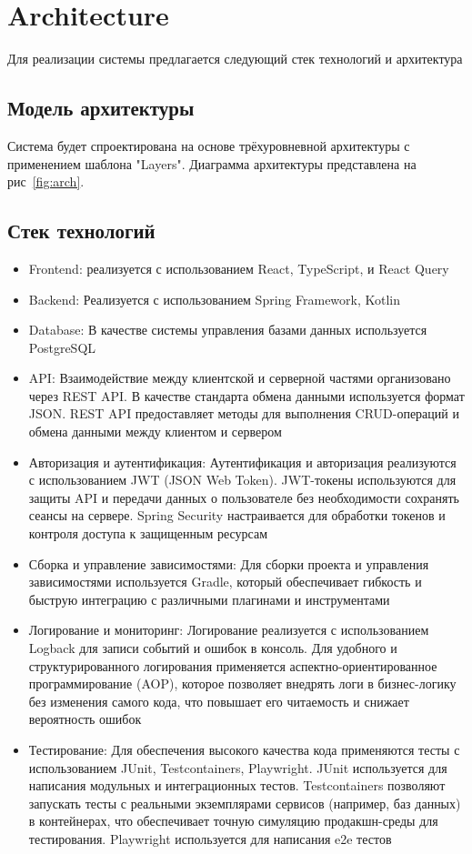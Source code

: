\section{Architecture}
Для реализации системы предлагается следующий стек технологий и архитектура

\subsection{Модель архитектуры}
 Система будет спроектирована на основе трёхуровневной архитектуры с применением шаблона "Layers".
 Диаграмма архитектуры представлена на рис~\ref{fig:arch}.
\subsection{Стек технологий}
\begin{itemize}
    \item Frontend: реализуется с использованием React, TypeScript, и React Query
    \item Backend: Реализуется с использованием Spring Framework, Kotlin
    \item Database: В качестве системы управления базами данных используется PostgreSQL    
    \item API: Взаимодействие между клиентской и серверной частями организовано через REST API. В качестве стандарта обмена данными используется формат JSON. REST API предоставляет методы для выполнения CRUD-операций и обмена данными между клиентом и сервером
    \item Авторизация и аутентификация: Аутентификация и авторизация реализуются с использованием JWT (JSON Web Token). JWT-токены используются для защиты API и передачи данных о пользователе без необходимости сохранять сеансы на сервере. Spring Security настраивается для обработки токенов и контроля доступа к защищенным ресурсам
    \item Сборка и управление зависимостями: Для сборки проекта и управления зависимостями используется Gradle, который обеспечивает гибкость и быструю интеграцию с различными плагинами и инструментами
    \item Логирование и мониторинг: Логирование реализуется с использованием Logback для записи событий и ошибок в консоль. Для удобного и структурированного логирования применяется аспектно-ориентированное программирование (AOP), которое позволяет внедрять логи в бизнес-логику без изменения самого кода, что повышает его читаемость и снижает вероятность ошибок
    \item Тестирование: Для обеспечения высокого качества кода применяются тесты с использованием JUnit, Testcontainers, Playwright. JUnit используется для написания модульных и интеграционных тестов. Testcontainers позволяют запускать тесты с реальными экземплярами сервисов (например, баз данных) в контейнерах, что обеспечивает точную симуляцию продакшн-среды для тестирования. Playwright используется для написания e2e тестов
\end{itemize}

